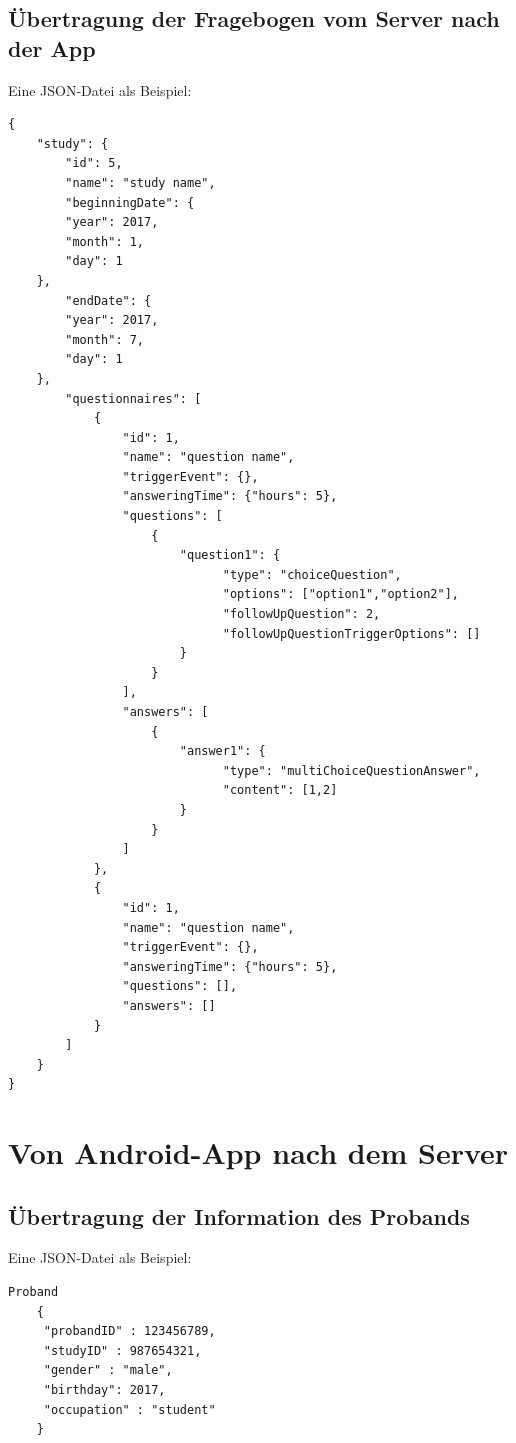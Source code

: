 \documentclass[a4paper]{scrreprt}
\begin{document}
{            \subsection{Übertragung der Fragebogen vom Server nach der App}
                Eine JSON-Datei als Beispiel:
                \begin{lstlisting}
{
    "study": {
        "id": 5,
        "name": "study name",
        "beginningDate": {
        "year": 2017,
        "month": 1,
        "day": 1
    },
        "endDate": {
        "year": 2017,
        "month": 7,
        "day": 1
    },
        "questionnaires": [
            {
                "id": 1,
                "name": "question name",
                "triggerEvent": {},
                "answeringTime": {"hours": 5},
                "questions": [
                    {
                        "question1": {
                              "type": "choiceQuestion",
                              "options": ["option1","option2"],
                              "followUpQuestion": 2,
                              "followUpQuestionTriggerOptions": []
                        }
                    }
                ],
                "answers": [
                    {
                        "answer1": {
                              "type": "multiChoiceQuestionAnswer",
                              "content": [1,2]
                        }
                    }
                ]
            },
            {
                "id": 1,
                "name": "question name",
                "triggerEvent": {},
                "answeringTime": {"hours": 5},
                "questions": [],
                "answers": []
            }
        ]
    }
}
            \end{lstlisting}


        \newpage
        \section{Von Android-App nach dem Server}

            \subsection{Übertragung der Information des Probands}

                Eine JSON-Datei als Beispiel:

\begin{lstlisting}[style=json]
    Proband
    {
     "probandID" : 123456789,
     "studyID" : 987654321,
     "gender" : "male",
     "birthday": 2017,
     "occupation" : "student"
    }
\end{lstlisting}


}
\end{document}
